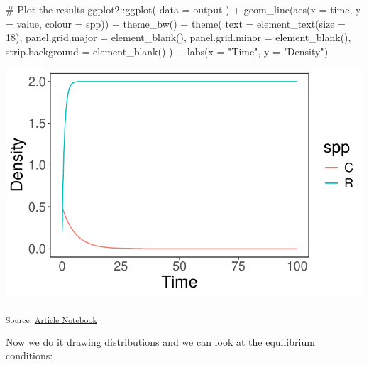 \documentclass[
  letterpaper,
  DIV=11,
  numbers=noendperiod]{scrartcl}
\newenvironment{Shaded}{\begin{snugshade}}{\end{snugshade}}
\newcommand{\AttributeTok}[1]{\textcolor[rgb]{0.40,0.45,0.13}{#1}}
\newcommand{\CommentTok}[1]{\textcolor[rgb]{0.37,0.37,0.37}{#1}}
\newcommand{\DecValTok}[1]{\textcolor[rgb]{0.68,0.00,0.00}{#1}}
\newcommand{\FunctionTok}[1]{\textcolor[rgb]{0.28,0.35,0.67}{#1}}
\newcommand{\NormalTok}[1]{\textcolor[rgb]{0.00,0.23,0.31}{#1}}
\newcommand{\SpecialCharTok}[1]{\textcolor[rgb]{0.37,0.37,0.37}{#1}}
\newcommand{\StringTok}[1]{\textcolor[rgb]{0.13,0.47,0.30}{#1}}
\begin{document}
\begin{Shaded}
\begin{Highlighting}[]
\CommentTok{\# Plot the results}
\NormalTok{ggplot2}\SpecialCharTok{::}\FunctionTok{ggplot}\NormalTok{(}
    \AttributeTok{data =}\NormalTok{ output}
\NormalTok{) }\SpecialCharTok{+}
    \FunctionTok{geom\_line}\NormalTok{(}\FunctionTok{aes}\NormalTok{(}\AttributeTok{x =}\NormalTok{ time, }\AttributeTok{y =}\NormalTok{ value, }\AttributeTok{colour =}\NormalTok{ spp)) }\SpecialCharTok{+}
    \FunctionTok{theme\_bw}\NormalTok{() }\SpecialCharTok{+}
    \FunctionTok{theme}\NormalTok{(}
        \AttributeTok{text =} \FunctionTok{element\_text}\NormalTok{(}\AttributeTok{size =} \DecValTok{18}\NormalTok{),}
        \AttributeTok{panel.grid.major =} \FunctionTok{element\_blank}\NormalTok{(),}
        \AttributeTok{panel.grid.minor =} \FunctionTok{element\_blank}\NormalTok{(),}
        \AttributeTok{strip.background =} \FunctionTok{element\_blank}\NormalTok{()}
\NormalTok{    ) }\SpecialCharTok{+}
    \FunctionTok{labs}\NormalTok{(}\AttributeTok{x =} \StringTok{"Time"}\NormalTok{, }\AttributeTok{y =} \StringTok{"Density"}\NormalTok{)}
\end{Highlighting}
\end{Shaded}

\includegraphics{index_files/figure-pdf/unnamed-chunk-1-1.pdf}

\textsubscript{Source:
\href{https://colebrookson.github.io/theRmal-landscape/index.qmd.html}{Article
Notebook}}

Now we do it drawing distributions and we can look at the equilibrium
conditions:
\end{document}
